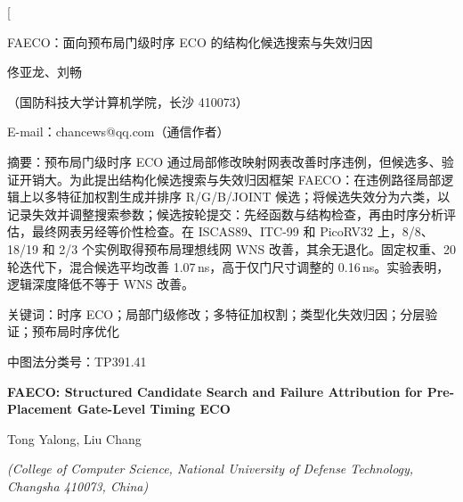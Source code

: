 \documentclass[twocolumn,10pt,fontset=windows]{ctexart}
\let\songti\songfamily\let\heiti\heifamily\let\fangsong\fangfamily
\begin{document}
\pagestyle{plain}

\twocolumn[
\vspace*{-0.25cm}
\begin{center}
{\heiti{} FAECO：面向预布局门级时序 ECO 的结构化候选搜索与失效归因}\par
\vspace{6pt}
{\fangsong{} 佟亚龙、刘畅}\par
\vspace{4pt}
{\songti\fontsize{8}{12}\selectfont（国防科技大学计算机学院，长沙 410073）}\par\vspace{2pt}
{\songti\fontsize{8}{12}\selectfont E-mail：chancews@qq.com（通信作者）}\par
\vspace{6pt}
\end{center}
\begin{flushleft}
  {\heiti\fontsize{8.5}{13}\selectfont 摘\quad 要：}{\songti\fontsize{8.5}{13}\selectfont 预布局门级时序 ECO 通过局部修改映射网表改善时序违例，但候选多、验证开销大。为此提出结构化候选搜索与失效归因框架 FAECO：在违例路径局部逻辑上以多特征加权割生成并排序 R/G/B/JOINT 候选；将候选失效分为六类，以记录失效并调整搜索参数；候选按轮提交：先经函数与结构检查，再由时序分析评估，最终网表另经等价性检查。在 ISCAS89、ITC-99 和 PicoRV32 上，8/8、18/19 和 2/3 个实例取得预布局理想线网 WNS 改善，其余无退化。固定权重、20 轮迭代下，混合候选平均改善 1.07\,ns，高于仅门尺寸调整的 0.16\,ns。实验表明，逻辑深度降低不等于 WNS 改善。}
\par
\vspace{4pt}
{\heiti\fontsize{8.5}{13}\selectfont 关键词：}{\songti\fontsize{8.5}{13}\selectfont 时序 ECO；局部门级修改；多特征加权割；类型化失效归因；分层验证；预布局时序优化}\par
\vspace{2pt}
{\songti\fontsize{8.5}{13}\selectfont 中图法分类号：TP391.41}\par
\vspace{3pt}
\end{flushleft}
\vspace{2pt}
\begin{center}
{\bfseries\fontsize{12.5}{16}\selectfont FAECO: Structured Candidate Search and Failure Attribution for Pre-Placement Gate-Level Timing ECO}\par
\vspace{3pt}
{\normalsize Tong Yalong, Liu Chang\par}
\vspace{3pt}
{\small \itshape (College of Computer Science, National University of Defense Technology, Changsha 410073, China)}\par
\vspace{4pt}
\end{center}
\end{document}
